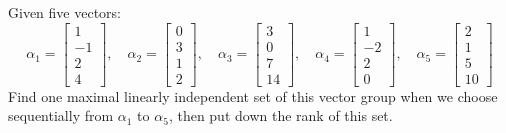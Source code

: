 \question Given five vectors: \[
    \alpha_1 = \displaystyle\begin{bmatrix}
        1 \\ -1 \\ 2 \\ 4
    \end{bmatrix}, \quad
    \alpha_2 = \displaystyle\begin{bmatrix}
        0 \\ 3 \\ 1 \\ 2
    \end{bmatrix}, \quad
    \alpha_3 = \displaystyle\begin{bmatrix}
        3 \\ 0 \\ 7 \\ 14
    \end{bmatrix}, \quad
    \alpha_4 = \displaystyle\begin{bmatrix}
        1 \\ -2 \\ 2 \\ 0
    \end{bmatrix}, \quad
    \alpha_5 = \displaystyle\begin{bmatrix}
        2 \\ 1 \\ 5 \\ 10
    \end{bmatrix}
\]
Find one maximal linearly independent set of this vector group when we choose
sequentially from $\alpha_1$ to $\alpha_5$, then put down the rank of this set.

